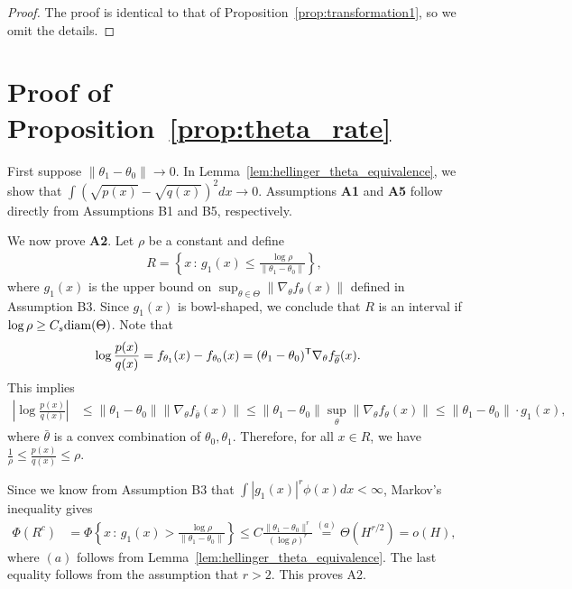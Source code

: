 \documentclass{article}
\begin{document}
\begin{proof}
The proof is identical to that of Proposition~\ref{prop:transformation1}, so we omit the details.
\end{proof}


\section{Proof of Proposition~\ref{prop:theta_rate}}
\label{sec:theta_rate_proof}


First suppose $\| \theta_1 - \theta_0 \| \rightarrow 0$. In Lemma~\ref{lem:hellinger_theta_equivalence}, we show that $\int (\sqrt{p(x)} - \sqrt{q(x)})^2 dx \rightarrow 0$. Assumptions \textbf{A1} and \textbf{A5} follow directly from Assumptions B1 and B5, respectively. 

We now prove \textbf{A2}. Let $\rho$ be a constant and define 
\begin{align}
R = \left\{ x \,:\, g_1(x) 
      \leq \frac{\log \rho}{\| \theta_1 - \theta_0 \|} \right\}, \label{eqn:parametric_R_defn}
\end{align}
where $g_1(x)$ is the upper bound on $\sup_{\theta \in \Theta} \| \nabla_\theta f_\theta(x) \|$ defined in Assumption B3. Since $g_1(x)$ is bowl-shaped, we conclude that $R$ is an interval if $\log \rho \geq C_s \textrm{diam}(\Theta)$. Note that
\begin{align*}
\log \frac{p(x)}{q(x)} &= f_{\theta_1}(x) - f_{\theta_0}(x) = (\theta_1 - \theta_0)^{\mathsf{T}} \nabla_{\theta} f_{\overline{\theta}} (x).
\end{align*}
This implies 
\begin{align*}
\left | \log \frac{p(x)}{q(x)} \right | &\leq \| \theta_1 - \theta_0 \| \| \nabla_{\theta} f_{\bar{\theta}} (x) \| \leq  \| \theta_1 - \theta_0 \| \sup_\theta \| \nabla_{\theta} f_{\theta} (x) \| \le \|\theta_1 - \theta_0\| \cdot g_1(x),
\end{align*}
where $\bar{\theta}$ is a convex combination of $\theta_0, \theta_1$. Therefore, for all $ x \in R$, we have $\frac{1}{\rho} \leq \frac{p(x)}{q(x)} \leq \rho$.

Since we know from Assumption B3 that $\int |g_1(x)|^r \phi(x) dx < \infty$, Markov's inequality gives
\begin{align*}
\Phi(R^c) &= \Phi \left\{ x \,:\, g_1(x) 
    > \frac{\log \rho}{\| \theta_1 - \theta_0 \|} \right\} 
    \leq C \frac{\| \theta_1 - \theta_0 \|^{r}}{(\log \rho)^{r}} 
    \stackrel{(a)}= \Theta( H^{r/2} ) = o(H),
\end{align*}
where $(a)$ follows from Lemma~\ref{lem:hellinger_theta_equivalence}. The last equality follows from the assumption that $r > 2$. This proves A2.
\end{document}
